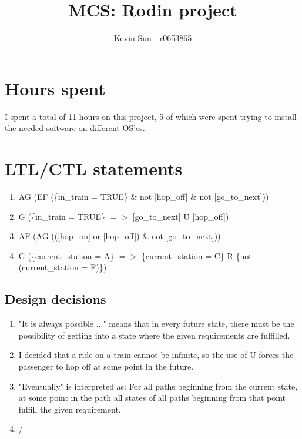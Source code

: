 \documentclass[11pt,a4paper]{article}
\author{Kevin Sun - r0653865}
\title{MCS: Rodin project}
\begin{document}
\maketitle
\section{Hours spent}
I spent a total of 11 hours on this project, 5 of which were spent trying to install the needed software on different OS'es.

\section{LTL/CTL statements}
\begin{enumerate}
	\item AG (EF (\{in\_train = TRUE\} \& not [hop\_off] \& not [go\_to\_next]))
	\item G (\{in\_train = TRUE\} $=>$ [go\_to\_next] U [hop\_off])
	\item AF (AG (([hop\_on] or [hop\_off]) \& not [go\_to\_next]))
	\item G (\{current\_station = A\} $=>$ \{current\_station = C\} R \{not (current\_station = F)\})
\end{enumerate}
\subsection{Design decisions}
\begin{enumerate}
	\item "It is always possible ..." means that in every future state, there must be the possibility of getting into a state where the given requirements are fulfilled.
	\item I decided that a ride on a train cannot be infinite, so the use of U forces the passenger to hop off at some point in the future.
	\item "Eventually" is interpreted as: For all paths beginning from the current state, at some point in the path all states of all paths beginning from that point fulfill the given requirement.
	\item /
\end{enumerate}
\end{document}

